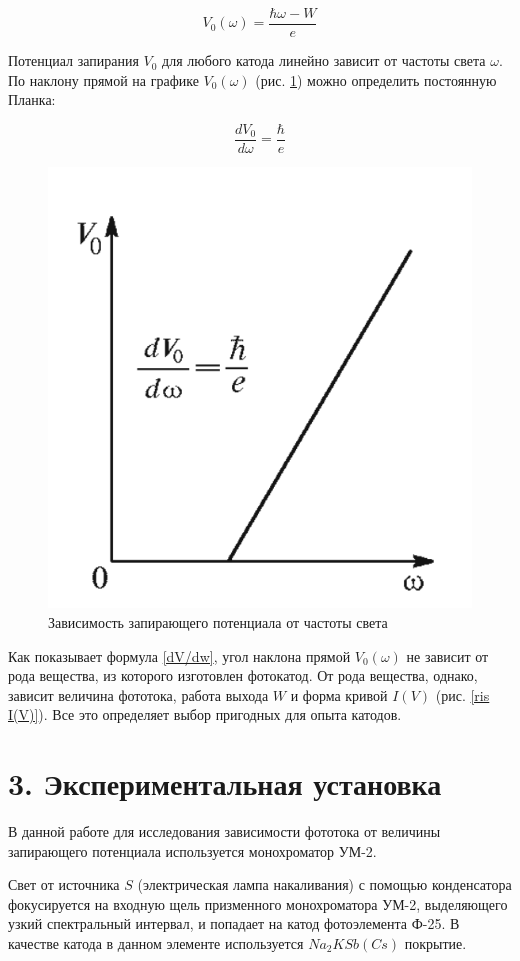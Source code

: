 \documentclass[a4paper,12pt]{report}
\begin{document}
 	\begin{equation}\label{V(w)}
	V_0 (\omega) = \dfrac{\hbar\omega - W}{e}
	\end{equation}
 
	Потенциал запирания $ V_0 $ для любого катода линейно зависит от
	частоты света $ \omega $. По наклону прямой на графике $ V_0(\omega) $ (рис. \ref{ris V(w)}) можно определить постоянную Планка:
	
	\begin{equation}\label{dV/dw}
	\dfrac{dV_0}{d\omega} = \dfrac{\hbar}{e}
	\end{equation}


\begin{figure}[H]
\centering
\includegraphics[width=0.4\linewidth]{V_w.png}
\caption{Зависимость запирающего потенциала от частоты света}
\label{ris V(w)}
\end{figure}

 
Как показывает формула \eqref{dV/dw}, угол наклона прямой $ V_0(\omega) $ не зависит от рода вещества, из которого изготовлен фотокатод. От рода вещества, однако, зависит величина фототока, работа выхода $ W $ и форма кривой $ I(V) $ (рис. \ref{ris I(V)}). Все это определяет выбор пригодных для
	опыта катодов.

 
\section*{3. Экспериментальная установка}
В данной работе для исследования зависимости фототока от величины запирающего потенциала используется монохроматор УМ-2. 

Свет от источника $S$ (электрическая лампа накаливания) с помощью конденсатора фокусируется на входную щель призменного монохроматора УМ-2, выделяющего узкий спектральный интервал, и попадает на катод фотоэлемента Ф-25. В качестве катода в данном элементе используется $Na_{2}KSb(Cs)$ покрытие.
\end{document}

